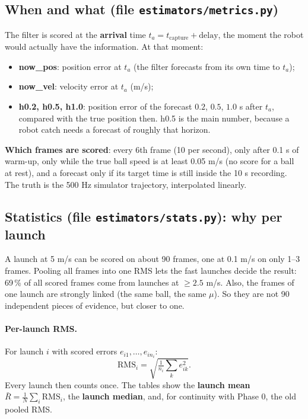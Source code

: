 \documentclass[11pt,a4paper]{article}
\begin{document}
\subsection{When and what (file \texttt{estimators/metrics.py})}
The filter is scored at the \textbf{arrival} time $t_a=t_{\text{capture}}+\text{delay}$, the moment the robot would
actually have the information. At that moment:
\begin{itemize}
\item \textbf{now\_pos}: position error at $t_a$ (the filter forecasts from its own time to $t_a$);
\item \textbf{now\_vel}: velocity error at $t_a$ (m/s);
\item \textbf{h0.2, h0.5, h1.0}: position error of the forecast $0.2$, $0.5$, $1.0$ s after $t_a$, compared with the true
  position then. h0.5 is the main number, because a robot catch needs a forecast of roughly that horizon.
\end{itemize}
\textbf{Which frames are scored}: every 6th frame (10 per second), only after 0.1 s of warm-up, only while the true ball
speed is at least 0.05 m/s (no score for a ball at rest), and a forecast only if its target time is still inside the 10 s
recording. The truth is the 500 Hz simulator trajectory, interpolated linearly.

\subsection{Statistics (file \texttt{estimators/stats.py}): why per launch}
\begin{example}
A launch at 5 m/s can be scored on about 90 frames, one at 0.1 m/s on only 1--3 frames. Pooling all frames into one
RMS lets the fast launches decide the result: 69\,\% of all scored frames come from launches at $\ge2.5$ m/s. Also,
the frames of one launch are strongly linked (the same ball, the same $\mu$). So they are not 90 independent pieces of
evidence, but closer to one.
\end{example}

\paragraph{Per-launch RMS.} For launch $i$ with scored errors $e_{i1},\dots,e_{in_i}$:
\[ \mathrm{RMS}_i = \sqrt{\tfrac{1}{n_i}\textstyle\sum_k e_{ik}^2}. \]
Every launch then counts once. The tables show the \textbf{launch mean} $\bar R=\frac1N\sum_i \mathrm{RMS}_i$, the
\textbf{launch median}, and, for continuity with Phase 0, the old pooled RMS.
\end{document}
